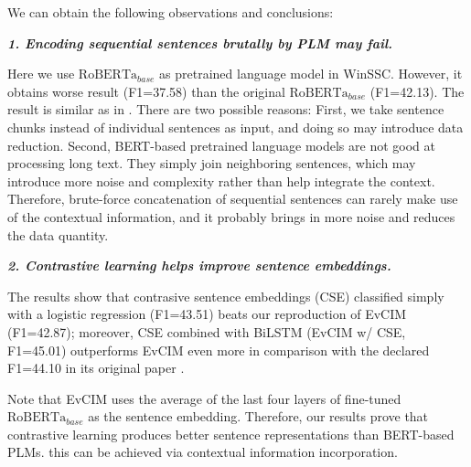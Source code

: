 We can obtain the following observations and conclusions:

\textit{\textbf{1. Encoding sequential sentences brutally by PLM may fail.}}


Here we use $\text{RoBERTa}_{base}$ as pretrained language model in WinSSC. However, it obtains worse result (F1=37.58) than the original $\text{RoBERTa}_{base}$ (F1=42.13). The result is similar as in \citet{van-den-berg-markert-2020-context}. There are two possible reasons: First, we take sentence chunks instead of individual sentences as input, and doing so may introduce data reduction. Second, BERT-based pretrained language models are not good at processing long text. They simply join neighboring sentences, which may introduce more noise and complexity rather than help integrate the context. Therefore, brute-force concatenation of sequential sentences can rarely make use of the contextual information, and it probably brings in more noise and reduces the data quantity. 

\textit{\textbf{2. Contrastive learning helps improve sentence embeddings.}}


The results show that contrasive sentence embeddings (CSE) classified simply with a logistic regression (F1=43.51) beats our reproduction of EvCIM (F1=42.87); moreover, CSE combined with BiLSTM (EvCIM w/ CSE, F1=45.01) outperforms EvCIM even more in comparison with the declared F1=44.10 in its original paper \citep{cohan-etal-2019-pretrained}. 

Note that EvCIM uses the average of the last four layers of fine-tuned $\text{RoBERTa}_{base}$ as the sentence embedding. Therefore, our results prove that contrastive learning produces better sentence representations than BERT-based PLMs. this can be achieved via contextual information incorporation. 

